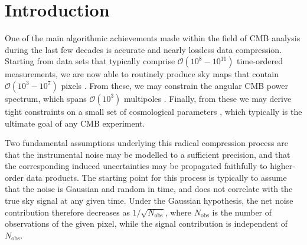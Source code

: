 \documentclass[twocolumn]{aa}
\begin{document}

\maketitle

\hypersetup{linkcolor=black}
\tableofcontents
\hypersetup{linkcolor=red} 


\section{Introduction}
\label{sec:introduction}

One of the main algorithmic achievements made within the field of CMB
analysis during the last few decades is accurate and nearly lossless
data compression. Starting from data sets that typically comprise
$\mathcal{O}(10^8-10^{11})$ time-ordered measurements, we are now able
to routinely produce sky maps that contain $\mathcal{O}(10^3-10^{7})$
pixels \citep[e.g.,][]{tegmark_mapmaking,ashdown:2007}. From these, we may constrain
the angular CMB power spectrum, which spans $\mathcal{O}(10^3)$
multipoles \citep[e.g.,][]{gorski:1994,hivon:2002,wandelt2004}. Finally, from
these we may derive tight constraints on a small set of cosmological
parameters \citep[e.g.,][]{bond:2000,cosmomc,planck2016-l05,planck2016-l06},
which typically is the ultimate goal of any CMB experiment.

Two fundamental assumptions underlying this radical compression process
are that the instrumental noise may be modelled to a sufficient
precision, and that the corresponding induced uncertainties may be
propagated faithfully to higher-order data products. The starting
point for this process is typically to assume that the noise is
Gaussian and random in time, and does not correlate with the true sky
signal at any given time. Under the Gaussian hypothesis, the net noise
contribution therefore decreases as $1/\sqrt{N_{\mathrm{obs}}}$, where
$N_{\mathrm{obs}}$ is the number of observations of the given pixel,
while the signal contribution is independent of $N_{\mathrm{obs}}$.
\end{document}
